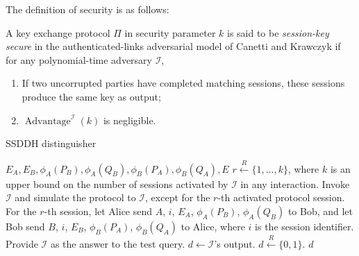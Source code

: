 The definition of security is as follows:

\begin{definition}\label{def:kep}
A key exchange protocol $\Pi$ in security parameter $k$ is said to be
\emph{session-key secure} in the authenticated-links adversarial model
of Canetti and Krawczyk if for any polynomial-time adversary $\mathcal{I}$,
\begin{enumerate}
\item If two uncorrupted parties have completed matching sessions,
  these sessions produce the same key as output;
\item $\operatorname{Advantage}^{\mathcal{I}}(k)$ is negligible.
\end{enumerate}
\end{definition}

\begin{algorithm}[t]
\caption{SSDDH distinguisher}
\label{alg:distinguisher}
\begin{algorithmic}[1]
\REQUIRE $E_A, E_B, \phi_A(P_B), \phi_A(Q_B), \phi_B(P_A),
\phi_B(Q_A), E$
\STATE $r \stackrel{R}{\leftarrow} \{1,\ldots,k\}$, where $k$ is an
upper bound on the number of sessions activated by $\mathcal{I}$ in any
interaction.
\STATE Invoke $\mathcal{I}$ and simulate the protocol to $\mathcal{I}$, except for the
$r$-th activated protocol session.
\STATE For the $r$-th session, let Alice send $A$, $i$, $E_A$, $\phi_A(P_B)$,
$\phi_A(Q_B)$ to Bob, and let Bob send $B$, $i$, $E_B$, $\phi_B(P_A)$,
$\phi_B(Q_A)$ to Alice, where $i$ is the session identifier.
\STATE Provide $\mathcal{I}$ as the answer to the test query.
\STATE $d \leftarrow \mathcal{I}$'s output.
\ELSE
\STATE $d \stackrel{R}{\leftarrow}\{0,1\}$.
\ENDIF
\ENSURE $d$

\end{algorithmic}
\end{algorithm}

